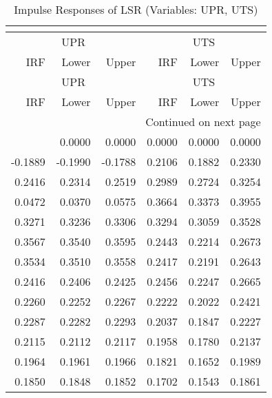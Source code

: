 \begin{longtable}{rrrrrr}
\caption{Impulse Responses of LSR (Variables: UPR, UTS)}\\
\label{tab:lsr_irf_group2}\\
\toprule
\multicolumn{3}{c}{UPR} & \multicolumn{3}{c}{UTS} \\
IRF & Lower & Upper & IRF & Lower & Upper \\
\midrule
\endfirsthead
\toprule
\multicolumn{3}{c}{UPR} & \multicolumn{3}{c}{UTS} \\
IRF & Lower & Upper & IRF & Lower & Upper \\
\midrule
\endhead
\midrule
\multicolumn{6}{r}{Continued on next page} \\
\midrule
\endfoot
\bottomrule
\endlastfoot
0.0000 & 0.0000 & 0.0000 & 0.0000 & 0.0000 & 0.0000 \\
-0.1889 & -0.1990 & -0.1788 & 0.2106 & 0.1882 & 0.2330 \\
0.2416 & 0.2314 & 0.2519 & 0.2989 & 0.2724 & 0.3254 \\
0.0472 & 0.0370 & 0.0575 & 0.3664 & 0.3373 & 0.3955 \\
0.3271 & 0.3236 & 0.3306 & 0.3294 & 0.3059 & 0.3528 \\
0.3567 & 0.3540 & 0.3595 & 0.2443 & 0.2214 & 0.2673 \\
0.3534 & 0.3510 & 0.3558 & 0.2417 & 0.2191 & 0.2643 \\
0.2416 & 0.2406 & 0.2425 & 0.2456 & 0.2247 & 0.2665 \\
0.2260 & 0.2252 & 0.2267 & 0.2222 & 0.2022 & 0.2421 \\
0.2287 & 0.2282 & 0.2293 & 0.2037 & 0.1847 & 0.2227 \\
0.2115 & 0.2112 & 0.2117 & 0.1958 & 0.1780 & 0.2137 \\
0.1964 & 0.1961 & 0.1966 & 0.1821 & 0.1652 & 0.1989 \\
0.1850 & 0.1848 & 0.1852 & 0.1702 & 0.1543 & 0.1861 \\
\end{longtable}